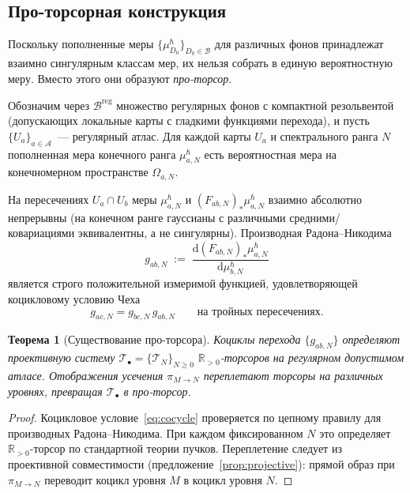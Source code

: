 \documentclass[12pt,a4paper]{article}
\theoremstyle{plain}
\newtheorem{theorem}{Теорема}[section]
\theoremstyle{definition}
\theoremstyle{remark}
\newcommand{\dd}{\mathrm{d}}
\newcommand{\R}{\mathbb{R}}
\begin{document}
\subsection{Про-торсорная конструкция}

Поскольку пополненные меры
$\{\mu_{D_0}^\hbar\}_{D_0 \in \mathcal{B}}$ для различных
фонов принадлежат взаимно сингулярным классам мер, их нельзя
собрать в единую вероятностную меру.  Вместо этого они
образуют \emph{про-торсор}.

Обозначим через $\mathcal{B}^{\mathrm{reg}}$ множество регулярных
фонов с компактной резольвентой (допускающих локальные карты
с гладкими функциями перехода), и пусть $\{U_a\}_{a \in \mathcal{A}}$~---
регулярный атлас.  Для каждой карты $U_a$ и спектрального
ранга $N$ пополненная мера конечного ранга $\mu_{a,N}^\hbar$
есть вероятностная мера на конечномерном пространстве
$\Omega_{a,N}$.

На пересечениях $U_a \cap U_b$ меры $\mu_{a,N}^\hbar$ и
$(F_{ab,N})_*\mu_{a,N}^\hbar$ взаимно абсолютно непрерывны
(на конечном ранге гауссианы с различными средними/ковариациями
эквивалентны, а не сингулярны).  Производная Радона--Никодима
\begin{equation}
  g_{ab,N} \;:=\; \frac{\dd(F_{ab,N})_*\mu_{a,N}^\hbar}
    {\dd\mu_{b,N}^\hbar}
\end{equation}
является строго положительной измеримой функцией,
удовлетворяющей коцикловому условию Чеха
\begin{equation}\label{eq:cocycle}
  g_{ac,N} = g_{bc,N}\,g_{ab,N}
  \qquad\text{на тройных пересечениях}.
\end{equation}

\begin{theorem}[Существование про-торсора]
\label{thm:pro-torsor}
Коциклы перехода $\{g_{ab,N}\}$ определяют проективную систему
$\mathcal{T}_\bullet = \{\mathcal{T}_N\}_{N \ge 0}$
$\R_{>0}$-торсоров на регулярном допустимом атласе.  Отображения
усечения $\pi_{M \to N}$ переплетают торсоры на различных
уровнях, превращая $\mathcal{T}_\bullet$ в про-торсор.
\end{theorem}

\begin{proof}
Коцикловое условие~\eqref{eq:cocycle} проверяется по цепному
правилу для производных Радона--Никодима.  При каждом фиксированном
$N$ это определяет $\R_{>0}$-торсор по стандартной теории пучков.
Переплетение следует из проективной совместимости
(предложение~\ref{prop:projective}): прямой образ при
$\pi_{M \to N}$ переводит коцикл уровня $M$ в коцикл
уровня $N$.
\end{proof}
\end{document}
